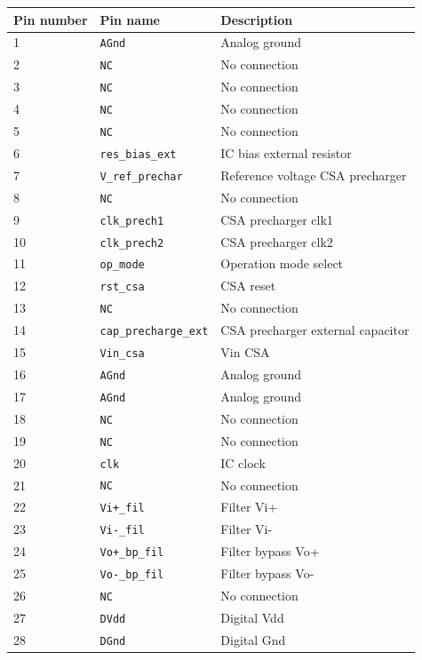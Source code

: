 \documentclass[11pt,letterpaper,spanish]{article}
\begin{document}
\begin{center}
\begin{longtable}{|l|l|l|}\hline
{\bf Pin number} & {\bf Pin name} & {\bf Description} \\ \hline\hline
1 & \verb=AGnd= & Analog ground \\\hline
2 & \verb=NC= & No connection \\\hline
3 & \verb=NC= & No connection \\\hline
4 & \verb=NC= & No connection \\\hline
5 & \verb=NC= & No connection \\\hline
6 & \verb=res_bias_ext= & IC bias external resistor \\\hline
7 & \verb=V_ref_prechar= & Reference voltage CSA precharger \\\hline
8 & \verb=NC= & No connection  \\\hline
9 &  \verb=clk_prech1= & CSA precharger clk1  \\\hline
10 & \verb=clk_prech2= & CSA precharger clk2  \\\hline
11 & \verb=op_mode= & Operation mode select \\\hline
12 & \verb=rst_csa= & CSA reset  \\\hline
13 & \verb=NC= & No connection \\\hline
14 & \verb=cap_precharge_ext= & CSA precharger external capacitor \\\hline
15 & \verb=Vin_csa= & Vin CSA \\\hline
16 & \verb=AGnd= & Analog ground \\\hline
17 & \verb=AGnd= & Analog ground \\\hline
18 & \verb=NC= & No connection \\\hline
19 & \verb=NC= & No connection \\\hline
20 & \verb=clk= & IC clock \\\hline
21 & \verb=NC= & No connection \\\hline
22 & \verb=Vi+_fil= & Filter Vi+ \\\hline
23 & \verb=Vi-_fil= & Filter Vi- \\\hline
24 & \verb=Vo+_bp_fil= & Filter bypass Vo+  \\\hline
25 & \verb=Vo-_bp_fil= & Filter bypass Vo- \\\hline
26 & \verb=NC= & No connection \\\hline
27 & \verb=DVdd= & Digital Vdd \\\hline
28 & \verb=DGnd= & Digital Gnd \\\hline

\end{longtable}
\end{center}
\end{document}
